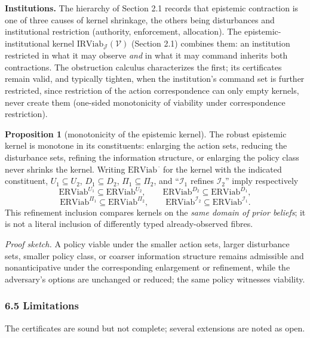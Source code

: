 \documentclass[10pt,twocolumn]{article}
\theoremstyle{definition}
\newtheorem{proposition}{Proposition}
\begin{document}
\textbf{Institutions.} The hierarchy of Section 2.1 records that
epistemic contraction is one of three causes of kernel shrinkage, the
others being disturbances and institutional restriction (authority,
enforcement, allocation). The epistemic-institutional kernel \(\mathrm{IRViab}_{\mathcal{J}}(\mathcal{V})\) (Section 2.1) combines them: an institution restricted in what it
may observe \emph{and} in what it may command inherits both
contractions. The obstruction calculus characterizes the first; its certificates remain valid, and typically tighten, when the institution's command set is further restricted, since restriction of
the action correspondence can only empty kernels, never create them
(one-sided monotonicity of viability under correspondence restriction).

\begin{proposition}[monotonicity of the epistemic kernel]\label{calc-prop:monotone}
The robust epistemic kernel is monotone in its constituents: enlarging
the action sets, reducing the disturbance sets, refining the information
structure, or enlarging the policy class never shrinks the kernel.
Writing \(\mathrm{ERViab}^{\,\cdot}\) for the kernel with the indicated
constituent, \(U_1\subseteq U_2\), \(D_1\subseteq D_2\),
\(\Pi_1\subseteq\Pi_2\), and ``\(\mathcal{I}_1\) refines
\(\mathcal{I}_2\)'' imply respectively
\[\mathrm{ERViab}^{U_1} \subseteq \mathrm{ERViab}^{U_2}, \qquad
\mathrm{ERViab}^{D_2} \subseteq \mathrm{ERViab}^{D_1},\]
\[\mathrm{ERViab}^{\Pi_1} \subseteq \mathrm{ERViab}^{\Pi_2}, \qquad
\mathrm{ERViab}^{\mathcal{I}_2} \subseteq \mathrm{ERViab}^{\mathcal{I}_1}.\]
This refinement inclusion compares kernels on the \emph{same domain of prior beliefs}; it is not a literal inclusion of differently typed already-observed fibres.
\end{proposition}

\emph{Proof sketch.} A policy viable under the smaller action sets, larger disturbance sets, smaller policy class, or coarser information structure remains admissible and nonanticipative under the corresponding enlargement or refinement, while the adversary's options are unchanged or reduced; the same policy witnesses viability.

\subsubsection{6.5 Limitations}\label{calc-limitations}

The certificates are sound but not complete; several extensions are noted as open.
\end{document}
